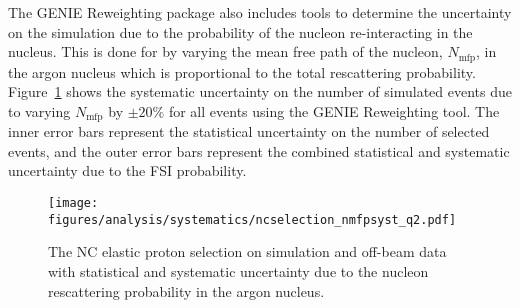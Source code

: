     The GENIE Reweighting package also includes tools to determine the
    uncertainty on the simulation due to the probability of the nucleon
    re-interacting in the nucleus. This is done for by varying the mean free
    path of the nucleon, $N_{\textrm{mfp}}$, in the argon nucleus which is
    proportional to the total rescattering probability.
    Figure~\ref{fig:systnmfp} shows the systematic uncertainty on the number of
    simulated events due to varying $N_{\textrm{mfp}}$ by $\pm 20\%$ for all
    events using the GENIE Reweighting tool. The inner error bars represent the
    statistical uncertainty on the number of selected events, and the outer
    error bars represent the combined statistical and systematic uncertainty
    due to the FSI probability. 
    \begin{figure}[ht]
      \centering
      \texttt{[image: figures/analysis/systematics/ncselection\_nmfpsyst\_q2.pdf]}
      \caption{The NC elastic proton selection on simulation and off-beam data
      with statistical and systematic uncertainty due to the nucleon
      rescattering probability in the argon nucleus.}
      \label{fig:systnmfp}
    \end{figure}

